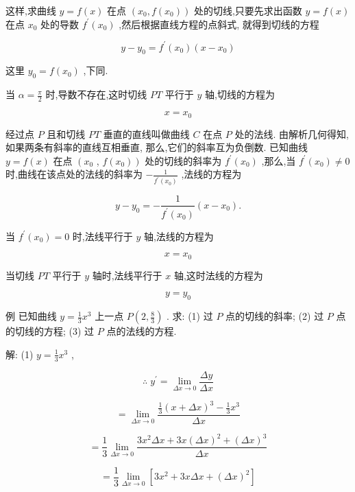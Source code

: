 \documentclass[lang=cn,newtx,10pt,scheme=chinese]{elegantbook}
\begin{document}
这样,求曲线 \(y = f\left( x\right)\) 在点 \(\left( {{x}_{0},f\left( {x}_{0}\right) }\right)\) 处的切线,只要先求出函数 \(y = f\left( x\right)\) 在点 \({x}_{0}\) 处的导数 \({f}^{\prime }\left( {x}_{0}\right)\) ,然后根据直线方程的点斜式, 就得到切线的方程

\[
y - {y}_{0} = {f}^{\prime }\left( {x}_{0}\right) \left( {x - {x}_{0}}\right)
\]

这里 \({y}_{0} = f\left( {x}_{0}\right)\) ,下同.

当 \(\alpha = \frac{\pi }{2}\) 时,导数不存在,这时切线 \({PT}\) 平行于 \(y\) 轴,切线的方程为

\[
x = {x}_{0}
\]

经过点 \(P\) 且和切线 \({PT}\) 垂直的直线叫做曲线 \(C\) 在点 \(P\) 处的法线. 由解析几何得知, 如果两条有斜率的直线互相垂直, 那么,它们的斜率互为负倒数. 已知曲线 \(y = f\left( x\right)\) 在点 \(\left( {x}_{0}\right.\) , \(\left. {f\left( {x}_{0}\right) }\right)\) 处的切线的斜率为 \({f}^{\prime }\left( {x}_{0}\right)\) ,那么,当 \({f}^{\prime }\left( {x}_{0}\right) \neq 0\) 时,曲线在该点处的法线的斜率为 \(- \frac{1}{{f}^{\prime }\left( {x}_{0}\right) }\) ,法线的方程为

\[
y - {y}_{0} = - \frac{1}{{f}^{\prime }\left( {x}_{0}\right) }\left( {x - {x}_{0}}\right) .
\]

当 \({f}^{\prime }\left( {x}_{0}\right) = 0\) 时,法线平行于 \(y\) 轴,法线的方程为

\[
x = {x}_{0}
\]

当切线 \({PT}\) 平行于 \(y\) 轴时,法线平行于 \(x\) 轴,这时法线的方程为

\[
y = {y}_{0}
\]

例 已知曲线 \(y = \frac{1}{3}{x}^{3}\) 上一点 \(P\left( {2,\frac{8}{3}}\right)\) . 求: (1) 过 \(P\) 点的切线的斜率; (2) 过 \(P\) 点的切线的方程; (3) 过 \(P\) 点的法线的方程.

解: (1) \(y = \frac{1}{3}{x}^{3}\) ,

\[
\therefore \;{y}^{\prime } = \mathop{\lim }\limits_{{{\Delta x} \rightarrow 0}}\frac{\Delta y}{\Delta x}
\]

\[
= \mathop{\lim }\limits_{{{\Delta x} \rightarrow 0}}\frac{\frac{1}{3}{\left( x + \Delta x\right) }^{3} - \frac{1}{3}{x}^{3}}{\Delta x}
\]

\[
= \frac{1}{3}\mathop{\lim }\limits_{{{\Delta x} \rightarrow 0}}\frac{3{x}^{2}{\Delta x} + {3x}{\left( \Delta x\right) }^{2} + {\left( \Delta x\right) }^{3}}{\Delta x}
\]

\[
= \frac{1}{3}\mathop{\lim }\limits_{{{\Delta x} \rightarrow 0}}\left\lbrack {3{x}^{2} + {3x\Delta x} + {\left( \Delta x\right) }^{2}}\right\rbrack
\]
\end{document}
